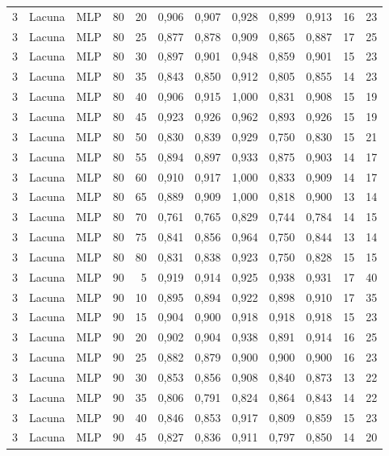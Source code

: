 \begin{longtable}{@{}rllrrrrrrrrr@{}}
3 & Lacuna & MLP & 80 & 20 & 0,906 & 0,907 & 0,928 & 0,899 & 0,913 & 16 & 23 \\
3 & Lacuna & MLP & 80 & 25 & 0,877 & 0,878 & 0,909 & 0,865 & 0,887 & 17 & 25 \\
3 & Lacuna & MLP & 80 & 30 & 0,897 & 0,901 & 0,948 & 0,859 & 0,901 & 15 & 23 \\
3 & Lacuna & MLP & 80 & 35 & 0,843 & 0,850 & 0,912 & 0,805 & 0,855 & 14 & 23 \\
3 & Lacuna & MLP & 80 & 40 & 0,906 & 0,915 & 1,000 & 0,831 & 0,908 & 15 & 19 \\
3 & Lacuna & MLP & 80 & 45 & 0,923 & 0,926 & 0,962 & 0,893 & 0,926 & 15 & 19 \\
3 & Lacuna & MLP & 80 & 50 & 0,830 & 0,839 & 0,929 & 0,750 & 0,830 & 15 & 21 \\
3 & Lacuna & MLP & 80 & 55 & 0,894 & 0,897 & 0,933 & 0,875 & 0,903 & 14 & 17 \\
3 & Lacuna & MLP & 80 & 60 & 0,910 & 0,917 & 1,000 & 0,833 & 0,909 & 14 & 17 \\
3 & Lacuna & MLP & 80 & 65 & 0,889 & 0,909 & 1,000 & 0,818 & 0,900 & 13 & 14 \\
3 & Lacuna & MLP & 80 & 70 & 0,761 & 0,765 & 0,829 & 0,744 & 0,784 & 14 & 15 \\
3 & Lacuna & MLP & 80 & 75 & 0,841 & 0,856 & 0,964 & 0,750 & 0,844 & 13 & 14 \\
3 & Lacuna & MLP & 80 & 80 & 0,831 & 0,838 & 0,923 & 0,750 & 0,828 & 15 & 15 \\
3 & Lacuna & MLP & 90 & 5 & 0,919 & 0,914 & 0,925 & 0,938 & 0,931 & 17 & 40 \\
3 & Lacuna & MLP & 90 & 10 & 0,895 & 0,894 & 0,922 & 0,898 & 0,910 & 17 & 35 \\
3 & Lacuna & MLP & 90 & 15 & 0,904 & 0,900 & 0,918 & 0,918 & 0,918 & 15 & 23 \\
3 & Lacuna & MLP & 90 & 20 & 0,902 & 0,904 & 0,938 & 0,891 & 0,914 & 16 & 25 \\
3 & Lacuna & MLP & 90 & 25 & 0,882 & 0,879 & 0,900 & 0,900 & 0,900 & 16 & 23 \\
3 & Lacuna & MLP & 90 & 30 & 0,853 & 0,856 & 0,908 & 0,840 & 0,873 & 13 & 22 \\
3 & Lacuna & MLP & 90 & 35 & 0,806 & 0,791 & 0,824 & 0,864 & 0,843 & 14 & 22 \\
3 & Lacuna & MLP & 90 & 40 & 0,846 & 0,853 & 0,917 & 0,809 & 0,859 & 15 & 23 \\
3 & Lacuna & MLP & 90 & 45 & 0,827 & 0,836 & 0,911 & 0,797 & 0,850 & 14 & 20 \\

\end{longtable}
